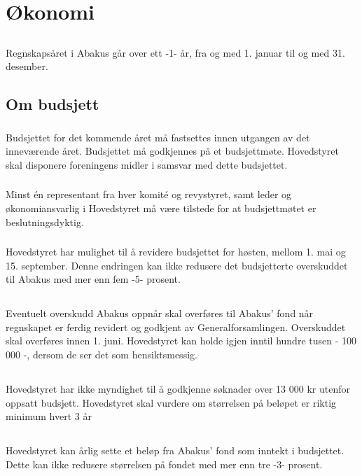\section{Økonomi}

\subsection{}
Regnskapsåret i Abakus går over ett -1- år, fra og med 1. januar til og med 31. desember.

\subsection{Om budsjett}
\subsubsection{}
Budsjettet for det kommende året må fastsettes innen utgangen av det inneværende året. Budsjettet må godkjennes på et budsjettmøte. Hovedstyret skal disponere foreningens midler i samsvar med dette budsjettet.

\subsubsection{}
Minst én representant fra hver komité og revystyret, samt leder og økonomiansvarlig i Hovedstyret må være tilstede for at budsjettmøtet er beslutningsdyktig.

\subsubsection{}
Hovedstyret har mulighet til å revidere budsjettet for høsten, mellom 1. mai og 15. september.
Denne endringen kan ikke redusere det budsjetterte overskuddet til Abakus med mer enn fem -5- prosent.

\subsection{}
Eventuelt overskudd Abakus oppnår skal overføres til Abakus’ fond når regnskapet er ferdig revidert
og godkjent av Generalforsamlingen. Overskuddet skal overføres innen 1. juni. Hovedstyret kan holde igjen inntil hundre tusen - 100 000 -, dersom de ser det som hensiktsmessig.

\subsection{}
Hovedstyret har ikke myndighet til å godkjenne søknader over 13 000 kr utenfor
oppsatt budsjett. Hovedstyret skal vurdere om størrelsen på beløpet er riktig minimum hvert 3 år

\subsection{}
Hovedstyret kan årlig sette et beløp fra Abakus’ fond som inntekt i budsjettet. Dette kan ikke redusere størrelsen på fondet med mer enn tre -3- prosent.
